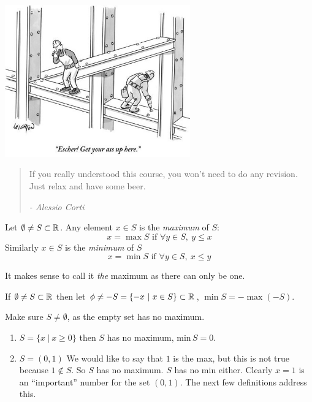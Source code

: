\documentclass[10pt]{scrartcl}
\begin{document}
\begin{center}
\includegraphics[width=8cm]{cartoon3.png}
\end{center}


\begin{quote}
If you really understood this course, you won't need to do any revision. Just relax and have some beer. 
\begin{flushright}
      \textit{ -  Alessio Corti}
       \end{flushright} 
\end{quote} \vspace*{5pt}

\vspace*{5pt}
\begin{definition}
Let $\emptyset \neq S \subset \mathbb{R}$. Any element $x \in S$ is the \emph{maximum} of $S$:
\[x = \max S\text{ if }\forall y \in S,~y \leq x\]
Similarly $x \in S$ is the \emph{minimum} of $S$	
\[x = \min S\text{ if }\forall y\in S,~x \leq y\]
\end{definition}\vspace*{5pt}

It makes sense to call it \emph{the} maximum as there can only be one.\vspace*{5pt}

\begin{remark}
If $\emptyset \neq S \subset \mathbb{R}$ then let $\phi \neq -S = \{-x ~|~ x \in S\}\subset \mathbb{R}$, $\min S = -\max(-S)$. 	
\end{remark}\vspace*{5pt}
\begin{warning}
Make sure $S \neq \emptyset$, as the empty set has no maximum. 	
\end{warning}\vspace*{10pt}


\begin{examples}
\begin{enumerate}
\item $S = \{x ~|~ x \geq 0\}$
then $S$ has no maximum, min\,$S = 0$.

\item $S = (0,1)$
We would like to say that $1$ is the max, but this is not true because $1 \not \in S$. So $S$ has no maximum. $S$ has no min either. Clearly $x = 1$ is an ``important'' number for the set $(0,1)$. The next few definitions address this. 	
\end{enumerate}
\end{examples}\vspace*{5pt}
\end{document}
